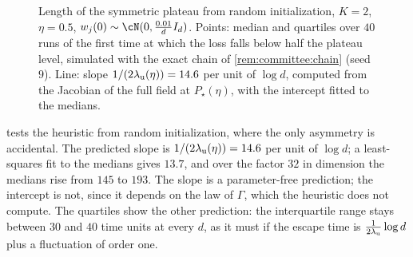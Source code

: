 \begin{refsection}
\begin{figure}[t]
\centering
{}
\caption{Length of the symmetric plateau from random initialization, $K=2$, $\eta=0.5$, $w_j(0)\sim\cN(0,\frac{0.01}{d}I_d)$. Points: median and quartiles over $40$ runs of the first time at which the loss falls below half the plateau level, simulated with the exact chain of \cref{rem:committee:chain} (seed $9$). Line: slope $1/(2\lambda_{\mathrm u}(\eta))=14.6$ per unit of $\log d$, computed from the Jacobian of the full field at $P_\star(\eta)$, with the intercept fitted to the medians.}\label{fig:committee:escape}
\end{figure}

 tests the heuristic from random initialization, where the only asymmetry is accidental. The predicted slope is $1/(2\lambda_{\mathrm u}(\eta))=14.6$ per unit of $\log d$; a least-squares fit to the medians gives $13.7$, and over the factor $32$ in dimension the medians rise from $145$ to $193$. The slope is a parameter-free prediction; the intercept is not, since it depends on the law of $\Gamma$, which the heuristic does not compute. The quartiles show the other prediction: the interquartile range stays between $30$ and $40$ time units at every $d$, as it must if the escape time is $\frac1{2\lambda_{\mathrm u}}\log d$ plus a fluctuation of order one.


\end{refsection}
